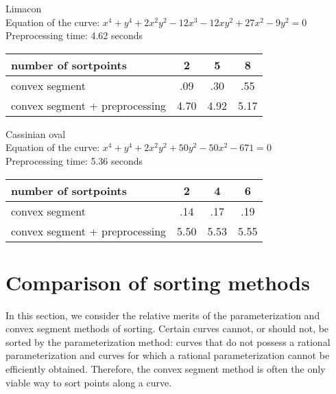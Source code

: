 \begin{example}
\label{eg-limacon}
Limacon\\
Equation of the curve: $x^{4} + y^{4} + 2x^{2}y^{2} - 12x^{3} - 12xy^{2} + 27x^{2} - 9y^{2} = 0$\\
Preprocessing time: 4.62\vspace{.5in} seconds\\
%
\begin{tabular}{|l|c|c|c|} \hline
number of sortpoints & 2 & 5 & 8 \\ \hline \hline
convex segment & .09 & .30 & .55 \\ \hline
convex segment + preprocessing & 4.70 & 4.92 & 5.17 \\ \hline
\end{tabular}
\end{example}


\clearpage
\begin{example}
\label{eg-Cassinian}
Cassinian oval\\
Equation of the curve: $x^{4} + y^{4} + 2x^{2}y^{2} + 50y^{2} - 50x^{2}-671 = 0$\\
Preprocessing time: 5.36\vspace{.5in} seconds\\
%
\begin{tabular}{|l|c|c|c|} \hline
number of sortpoints & 2 & 4 & 6 \\ \hline \hline
convex segment & .14 & .17 & .19 \\ \hline
convex segment + preprocessing & 5.50 & 5.53 & 5.55 \\ \hline
\end{tabular}
\end{example}


\section{Comparison of sorting methods}
\label{sc}

In this section, we consider the relative merits of the parameterization and
convex segment methods of sorting.
Certain curves cannot, or should 
not, be sorted by the parameterization method: curves that 
do not possess a rational parameterization and curves for which
a rational parameterization cannot be efficiently obtained.
Therefore, the convex segment method is often 
the only viable way to sort points along a curve.

